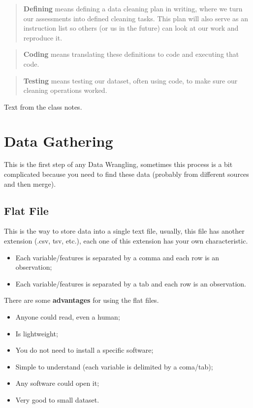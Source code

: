 \documentclass[]{book}
\providecommand{\tightlist}{%
  \setlength{\itemsep}{0pt}\setlength{\parskip}{0pt}}
\begin{document}
\begin{quote}
\textbf{Defining} means defining a data cleaning plan in writing, where
we turn our assessments into defined cleaning tasks. This plan will also
serve as an instruction list so others (or us in the future) can look at
our work and reproduce it.
\end{quote}

\begin{quote}
\textbf{Coding} means translating these definitions to code and
executing that code.
\end{quote}

\begin{quote}
\textbf{Testing} means testing our dataset, often using code, to make
sure our cleaning operations worked.
\end{quote}

Text from the class notes.

\section{Data Gathering}\label{data-gathering}

This is the first step of any Data Wrangling, sometimes this process is
a bit complicated because you need to find these data (probably from
different sources and then merge).

\subsection{Flat File}\label{flat-file}

This is the way to store data into a single text file, usually, this
file has another extension (.csv, tsv, etc.), each one of this extension
has your own characteristic.

\begin{itemize}
\tightlist
\item
  Each variable/features is separated by a comma and each row is an
  observation;
\item
  Each variable/features is separated by a tab and each row is an
  observation.
\end{itemize}

There are some \textbf{advantages} for using the flat files.

\begin{itemize}
\tightlist
\item
  Anyone could read, even a human;
\item
  Is lightweight;
\item
  You do not need to install a specific software;
\item
  Simple to understand (each variable is delimited by a coma/tab);
\item
  Any software could open it;
\item
  Very good to small dataset.
\end{itemize}
\end{document}

